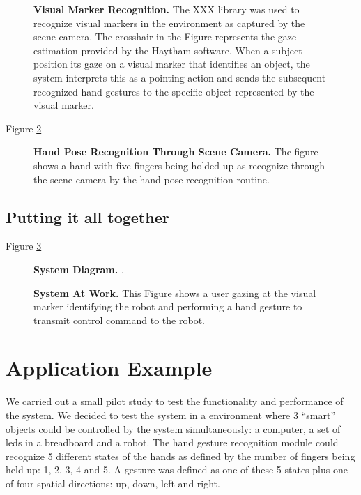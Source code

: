 \documentclass[jou,a4paper,notxfonts]{apa}
\begin{document}
\begin{figure}[tp]
 \caption{\textbf{Visual Marker Recognition.} The XXX library was used to recognize visual markers in the
 environment as captured by the scene camera. The crosshair in the Figure represents the gaze estimation provided by
 the Haytham software. When a subject position  its gaze  on a visual marker that identifies an object, the system
 interprets this as a pointing action and sends the subsequent recognized hand gestures to the
 specific object represented by the visual marker.}
 \label{visualMarker}
\end{figure}


Figure \ref{hand}

\begin{figure}[tp]
 \caption{\textbf{Hand Pose Recognition Through Scene Camera.} The figure shows a hand with five fingers being holded 
 up as recognize through the scene camera by the hand pose recognition routine.}
 \label{hand}
\end{figure}

\subsection{Putting it all together}



Figure \ref{systemDiagram}

\begin{figure}[tp]
 \caption{\textbf{System Diagram.} .}
 \label{systemDiagram}
\end{figure}


\begin{figure}[tp]
 \caption{\textbf{System At Work.} This Figure shows a user gazing at the visual marker identifying the robot and
 performing a hand gesture to transmit control command to the robot.}
 \label{systemAtWork}
\end{figure}

\section{Application Example}
We carried out a small pilot study to test the functionality and performance of the system. We decided to test the
system in a environment where 3 ``smart'' objects could be controlled by the system simultaneously: a computer, a set of
leds in a breadboard and a robot. The hand gesture recognition module could recognize 5 different states of the hands
as defined by the number of fingers being held up: 1, 2, 3, 4 and 5. A gesture was defined as one of these 5 states plus
one of four spatial directions: up, down, left and right.
\end{document}
